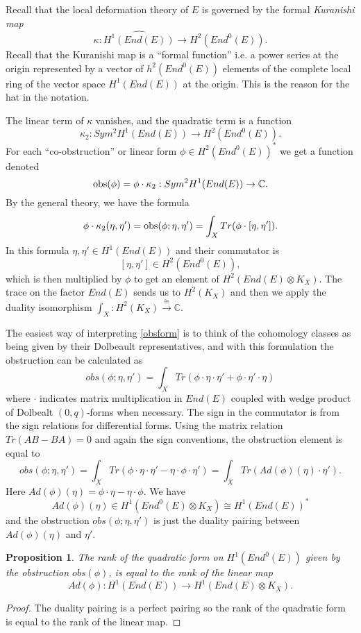 \documentclass{amsart}
\theoremstyle{plain}
\newtheorem{proposition}[theorem]{Proposition}
\numberwithin{equation}{section}
\begin{document}
Recall that the local deformation theory of $E$ is 
governed by the  formal {\em Kuranishi map}
$$
\kappa : \widehat{H^1(End (E))}\rightarrow H^2(End^0(E)).
$$
Recall that the Kuranishi map is a
``formal function'' i.e. a power series at the origin represented by a
vector of $h^2(End^0(E))$ 
elements of the complete local ring of the vector space $H^1(End (E))$ at the origin.
This is the reason for the hat in the notation. 

The linear term of $\kappa$ vanishes, and the quadratic term is a function  
$$
\kappa _2 : Sym ^2H^1(End (E)) \rightarrow H^2(End^0(E)) .
$$
For each ``co-obstruction'' or linear form $\phi \in H^2(End^0(E))^{\ast}$ 
we get a function denoted 
$$
{{\rm obs}} (\phi ) = \phi \cdot \kappa _2 : Sym ^2H^1(End (E)) \rightarrow {{\mathbb C}} .
$$
By the general theory, we have the formula
\begin{equation}
\label{obsform}
\phi \cdot \kappa _2 (\eta , \eta ' ) =
{{\rm obs}} (\phi ; \eta , \eta ') = \int _X Tr (\phi \cdot [\eta , \eta ']) .
\end{equation}
In this formula $\eta , \eta ' \in H^1(End (E))$ and their commutator is
$$
[\eta , \eta ']\in H^2(End^0(E)),
$$
which is then multiplied by $\phi$ to get an element of $H^2(End(E)\otimes K_X)$.
The trace on the factor $End(E)$ sends us to $H^2(K_X)$ and then we apply
the duality isomorphism $\int _X : H^2(K_X)\stackrel{\cong}{\rightarrow} {{\mathbb C}}$.

The easiest way of interpreting \eqref{obsform} is to think of the cohomology classes as being given by their Dolbeault
representatives, and with this formulation the obstruction can be calculated as
$$
obs(\phi ; \eta , \eta ')=
\int _X Tr(\phi \cdot \eta \cdot \eta ' + \phi \cdot \eta' \cdot \eta )
$$
where $\cdot$ indicates matrix multiplication in $End(E)$ coupled with wedge product of
Dolbealt $(0,q)$-forms when necessary. The sign in the commutator is from the
sign relations for differential forms. Using the matrix relation $Tr(AB-BA)=0$
and again the sign conventions,
the obstruction element is equal to 
$$
obs(\phi ; \eta , \eta ')=
\int _X Tr(\phi \cdot \eta \cdot \eta ' - \eta \cdot \phi \cdot \eta ')
= \int _X Tr (Ad(\phi )(\eta ) \cdot \eta ').
$$
Here $Ad(\phi )(\eta ) = \phi \cdot \eta - \eta \cdot \phi$. 
We have 
$$
Ad(\phi )(\eta )\in H^1(End^0(E)\otimes K_X)\cong H^1(End(E))^{\ast}
$$
and the obstruction $obs(\phi ; \eta , \eta ')$ is just the duality pairing between
$Ad(\phi )(\eta )$ and $\eta '$. 

\begin{proposition}
\label{rankeq}
The rank of the quadratic form on $H^1(End^0(E))$ given by the obstruction $obs(\phi )$,
is equal to the rank of the linear  map 
$$
Ad(\phi ) : H^1(End (E))\rightarrow H^1(End (E)\otimes K_X).
$$
\end{proposition}
\begin{proof}
The duality pairing is a perfect pairing so the rank of the quadratic form is
equal to the rank of the linear map. 
\end{proof}
\end{document}
